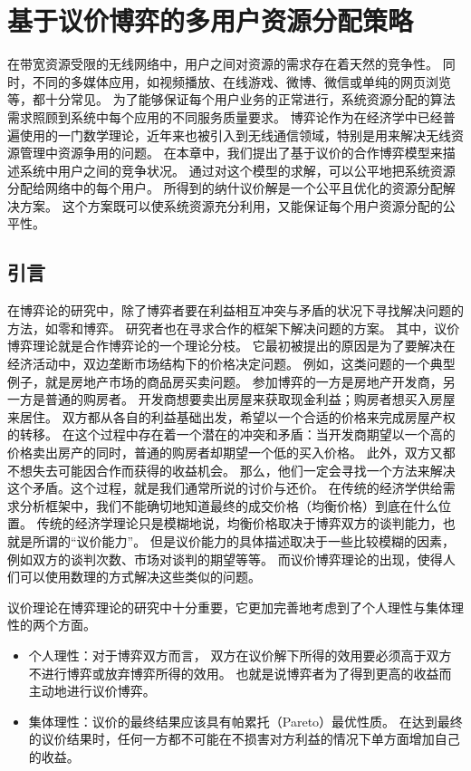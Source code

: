 \graphicspath{ {../body/nash_bargaining_figures/} }
\chapter{基于议价博弈的多用户资源分配策略}
在带宽资源受限的无线网络中，用户之间对资源的需求存在着天然的竞争性。
同时，不同的多媒体应用，如视频播放、在线游戏、微博、微信或单纯的网页浏览等，都十分常见。
为了能够保证每个用户业务的正常进行，系统资源分配的算法需求照顾到系统中每个应用的不同服务质量要求。
博弈论作为在经济学中已经普遍使用的一门数学理论，近年来也被引入到无线通信领域，特别是用来解决无线资源管理中资源争用的问题。
在本章中，我们提出了基于议价的合作博弈模型来描述系统中用户之间的竞争状况。
通过对这个模型的求解，可以公平地把系统资源分配给网络中的每个用户。
所得到的纳什议价解是一个公平且优化的资源分配解决方案。
这个方案既可以使系统资源充分利用，又能保证每个用户资源分配的公平性。

\section{引言}
在博弈论的研究中，除了博弈者要在利益相互冲突与矛盾的状况下寻找解决问题的方法，如零和博弈。
研究者也在寻求合作的框架下解决问题的方案。
其中，议价博弈理论就是合作博弈论的一个理论分枝。
它最初被提出的原因是为了要解决在经济活动中，双边垄断市场结构下的价格决定问题。
例如，这类问题的一个典型例子，就是房地产市场的商品房买卖问题。
参加博弈的一方是房地产开发商，另一方是普通的购房者。
开发商想要卖出房屋来获取现金利益；购房者想买入房屋来居住。
双方都从各自的利益基础出发，希望以一个合适的价格来完成房屋产权的转移。
在这个过程中存在着一个潜在的冲突和矛盾：当开发商期望以一个高的价格卖出房产的同时，普通的购房者却期望一个低的买入价格。
此外，双方又都不想失去可能因合作而获得的收益机会。
那么，他们一定会寻找一个方法来解决这个矛盾。这个过程，就是我们通常所说的讨价与还价。
在传统的经济学供给需求分析框架中，我们不能确切地知道最终的成交价格（均衡价格）到底在什么位置。
传统的经济学理论只是模糊地说，均衡价格取决于博弈双方的谈判能力，也就是所谓的“议价能力”。
但是议价能力的具体描述取决于一些比较模糊的因素，例如双方的谈判次数、市场对谈判的期望等等。
而议价博弈理论的出现，使得人们可以使用数理的方式解决这些类似的问题。

议价理论在博弈理论的研究中十分重要，它更加完善地考虑到了个人理性与集体理性的两个方面。

\begin{itemize}
\item 个人理性：对于博弈双方而言，
双方在议价解下所得的效用要必须高于双方不进行博弈或放弃博弈所得的效用。
也就是说博弈者为了得到更高的收益而主动地进行议价博弈。
\item 集体理性：议价的最终结果应该具有帕累托（Pareto）最优性质。
在达到最终的议价结果时，任何一方都不可能在不损害对方利益的情况下单方面增加自己的收益。
\end{itemize}

